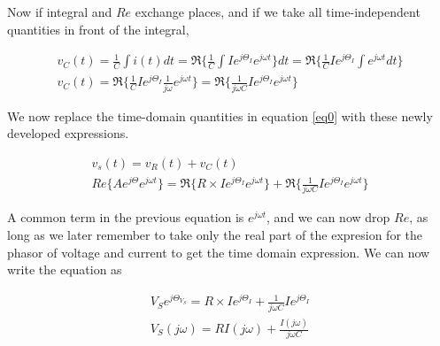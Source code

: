 \documentclass{ximera}
\begin{document}
\begin{example}
Now if integral and $Re$ exchange places, and if we take all time-independent quantities in front of the integral,



\begin{eqnarray}
v_C(t) = \frac{1}{C} \int i(t) dt  =  \Re\{   \frac{1}{C} \int I e^{j \Theta_I} e^{j \omega t}\}  dt  = \Re\{   \frac{1}{C}  I e^{j \Theta_I} \int e^{j \omega t}dt \}   \label{eq7} \\
v_C(t)= \Re\{   \frac{1}{C}  I e^{j \Theta_I} \frac{1}{j \omega} e^{j \omega t}  \}   = \Re\{   \frac{1}{j \omega C}  I e^{j \Theta_I}  e^{j \omega t}  \}  \label{eq8}
\end{eqnarray} 






We now replace the time-domain quantities in equation \ref{eq0} with
these newly developed expressions.



\begin{eqnarray}
v_s(t)=v_R(t) + v_C(t)  \\
Re\{A e^{j \Theta} e^{j \omega t}\}=    \Re\{R \times I e^{j \Theta_I} e^{j \omega t}\}   +  \Re\{   \frac{1}{j \omega C}  I e^{j \Theta_I}  e^{j \omega t}  \}
\end{eqnarray}

A common term in the previous equation is $ e^{j\omega t}$, and we can now drop $Re$, as long as we later remember to take only the real part of the expresion for the phasor of voltage and current to get the time domain expression. We can now
write the equation as




\begin{eqnarray}
 V_S  e^{j \Theta_{V_S}}  =R \times I e^{j \Theta_I}  +    \frac{1}{j \omega C}  I e^{j \Theta_I}  \\
V_S(j \omega)   = R I(j \omega)    + \frac{I(j \omega )}{j \omega C} 
\end{eqnarray}

\end{example}
\end{document}

